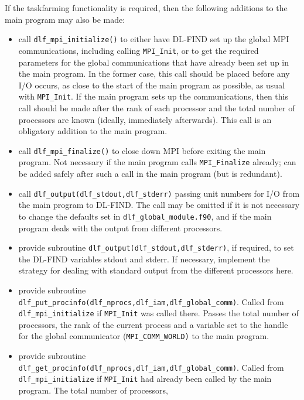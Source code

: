 \documentclass{article}
\begin{document}
If the taskfarming functionality is required, then the following additions to the 
main program may also be made:
\begin{itemize}
\item call \texttt{dlf\_mpi\_initialize()} to either have DL-FIND set up the global MPI communications, 
      including calling 
      \texttt{MPI\_Init}, or to get the required parameters for the global communications that have 
      already been set up in the 
      main program.  In the former case, this call should be placed before any 
      I/O occurs, as close to the start of the main program as possible, as 
      usual with \texttt{MPI\_Init}.  If the main program sets up the communications, then this 
      call should be made after the rank of each processor and the total number of processors are known 
      (ideally, immediately afterwards).
      This call is an obligatory addition to the main program.
\item call \texttt{dlf\_mpi\_finalize()} to close down MPI before exiting the main program.
      Not necessary if the main program calls \texttt{MPI\_Finalize} already; can be added 
      safely after such a call in the main program (but is redundant).
\item call \texttt{dlf\_output(dlf\_stdout,dlf\_stderr)} passing unit numbers for I/O from 
      the main program to DL-FIND.  The call may be omitted if it is not necessary to change 
      the defaults set in \texttt{dlf\_global\_module.f90}, and if the main program deals with 
      the output from different processors.
\item provide subroutine \texttt{dlf\_output(dlf\_stdout,dlf\_stderr)}, if required, to set 
      the DL-FIND variables stdout 
      and stderr.  If necessary, implement the strategy for dealing with standard output from the 
      different processors here.
\item provide subroutine \texttt{dlf\_put\_procinfo(dlf\_nprocs,dlf\_iam,dlf\_global\_comm)}. 
      Called from \texttt{dlf\_mpi\_initialize} if \texttt{MPI\_Init} was called there.  Passes the 
      total number of processors, 
      the rank of the current process and a variable set to the handle for the 
      global communicator (\texttt{MPI\_COMM\_WORLD)} to the main program. 
\item provide subroutine \texttt{dlf\_get\_procinfo(dlf\_nprocs,dlf\_iam,dlf\_global\_comm)}. 
      Called from \texttt{dlf\_mpi\_initialize} if \texttt{MPI\_Init} had already been called by the 
      main program.  The total number of processors, 

\end{itemize}
\end{document}
